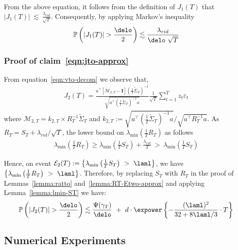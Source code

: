 \documentclass[11pt,letterpaper]{article}
\newcommand{\Prob}{\mathbb{P}}
\newcommand{\rpen}{\lambda_{rid}}
\newcommand{\Id}{\mathbf{I}}
\newcommand{\z}{z}
\newcommand{\err}{\Psi(\gamma_T)}
\newcommand{\PT}{\tilde{\Sigma}_T}
\newcommand{\Etwo}{\mathcal{E}_2(T)}
\theoremstyle{plain}
\theoremstyle{definition}  %
\begin{document}
\noindent From the above equation, it follows from the definition of $J_1(T)$ that $|J_1(T)| \ \lesssim \ \frac{\rpen}{\sqrt{T}}.$ Consequently, by applying Markov's inequality
\begin{align}\label{eqn:Jo-bdd}
    \Prob \left(|J_1(T)| > \frac{\delo}{2} \right) \lesssim \frac{\rpen}{\delo \ \sqrt{T}} 
\end{align}

\subsubsection*{Proof of claim~\eqref{eqn:jto-approx}}

\noindent From equation~\eqref{eqn:vto-decom} we observe that,
\begin{align*}
   J_2(T) = \frac{a^\top [\mathcal{M}_{2,T} - \Id]\left( \frac{1}{T} \PT \right)^{-1}}{\sqrt{a^\top  \left( \frac{1}{T} \PT \right)^{-1}a}  } \frac{1}{\sqrt{T}} 
  \sum^T_{t=1} \z_t \varepsilon_t
\end{align*}
where  $\mathcal{M}_{2,T} = k_{2,T} \times  R_T^{-1}\PT$ and $k_{2,T} := \sqrt{a^\top  \left( \frac{1}{T} \PT \right)^{-1}  a} / \sqrt{a^\top  R_T^{-1} a}$. As $R_T = S_T + \rpen/\sqrt{T}$, the lower bound on $\lambda_{\min} \left( \frac{1}{T} R_T \right)$ as follows
\begin{align*}
   \lambda_{\min} \left( \frac{1}{T} R_T\right) \geq  \lambda_{\min} \left( \frac{1}{T} S_T\right) + 
\frac{\rpen}{T} \ > \ \lambda_{\min} \left( \frac{1}{T} S_T\right)
\end{align*}

\noindent Hence, on event $\Etwo := \left\{ \lambda_{\min} \left( \frac{1}{T} S_T\right) \ > \ \laml \right\}$, we have $\left\{ \lambda_{\min} \left( \frac{1}{T} R_T\right) \ > \ \laml \right\}$. Therefore, by replacing $S_T$ with $R_T$ in the proof of Lemmas~\ref{lemma:ratto} and~\ref{lemma:RT-Etwo-approx} and applying Lemma~\ref{lemma:lmin-ST} we have:
\begin{align}\label{eqn:Jto-bdd}
       \Prob \left(|J_2(T)| > \frac{\delo}{2} \right) \lesssim \frac{\err}{\delo} \ + \  d \cdot \expower\left\{ - \frac{(\laml)^2}{32 +  8\laml/3} \cdot  T\right\}
    \end{align}  





\subsection{Numerical Experiments}\label{sec:ride-sim}
\end{document}
